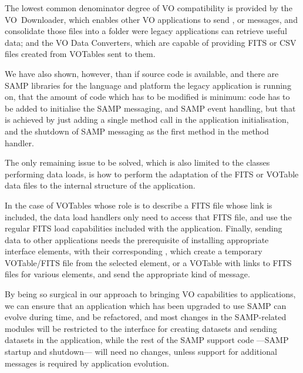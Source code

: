 		The lowest common denominator degree of VO compatibility is
		provided by the VO~Downloader, which enables other VO
		applications to send , or
		 messages, and consolidate those
		files into a folder were legacy applications can retrieve
		useful data; and the VO Data Converters, which are capable
		of providing FITS or CSV files created from VOTables sent
		to them.
		
		We have also shown, however, than if source code is
		available, and there are SAMP libraries for the language and
		platform the legacy application is running on, that the amount
		of code which has to be modified is minimum: code has to be
		added to initialise the SAMP messaging, and SAMP event
		handling, but that is achieved by just adding a single method
		call in the application initialisation, and the shutdown of
		SAMP messaging as the first method in the 
		method handler.
		
		The only remaining issue to be solved, which is also limited
		to the classes performing data loads, is how to perform the
		adaptation of the FITS or VOTable data files to the internal
		structure of the application.
		
		In the case of VOTables whose role is to describe a FITS file
		whose link is included, the data load handlers only need to
		access that FITS file, and use the regular FITS load
		capabilities included with the application. Finally, sending
		data to other applications needs the prerequisite of installing
		appropriate interface elements, with their corresponding
		, which create a temporary VOTable/FITS
		file from the selected element, or a VOTable with links to
		FITS files for various elements, and send the appropriate
		kind of message.
		
		By being so surgical in our approach to bringing VO
		capabilities to applications, we can ensure that an application
		which has been upgraded to use SAMP can evolve during time, and
		be refactored, and most changes in the SAMP-related modules
		will be restricted to the interface for creating datasets and
		sending datasets in the application, while the rest of the 
		SAMP support code ---SAMP startup and shutdown--- will need
		no changes, unless support for additional messages is
		required by application evolution.
		
	
